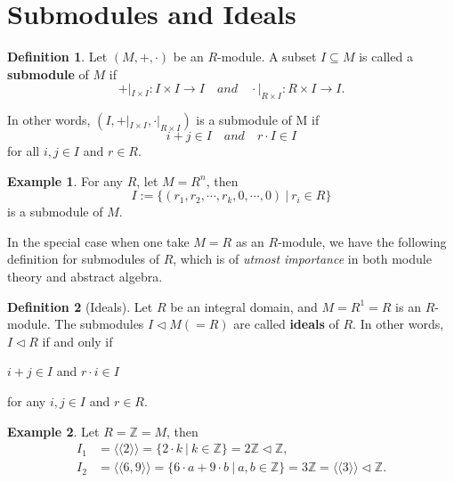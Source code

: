 \documentclass[11pt,openany]{book}
\theoremstyle{plain}
\theoremstyle{definition}
\newtheorem{definition}[definition]{Definition}
\newtheorem{example}[example]{Example}
\theoremstyle{remark}
\begin{document}
\section{Submodules and Ideals}
\begin{definition}
    Let $(M,+,\cdot)$ be an $R$-module. A subset $I \subseteq M$ is called a {\bf submodule} of $M$ if
    $$+|_{I \times I}:I \times I \to I \quad and \quad \cdot |_{R \times I}:R \times I \to I.$$
    
    In other words, $(I, +|_{I \times I}, \cdot|_{R \times I})$ is a submodule of M if
    $$i+j \in I \quad and \quad r \cdot I \in I$$
    for all $i,j \in I$ and $r \in R$.
\end{definition}

\begin{example} 
        For any $R$, let $M=R^{n}$, then 
        $$I:=\{ (r_1,r_2,\cdots,r_k,0,\cdots,0) \ |\ r_i \in R \}$$ 
        is a submodule of $M$.
\end{example}

In the special case when one take $M = R$ as an $R$-module, we have the following definition for submodules of $R$, which is of {\it utmost importance} in both module theory and abstract algebra.

\begin{definition}[Ideals]
    Let $R$ be an integral domain, and $M=R^{1}=R$ is an $R$-module. The submodules $I \lhd M(=R)$ are called {\bf ideals} of $R$. In other words, $I \lhd R$ if and only if 
    \begin{center}
    $i+j \in I$ \quad and  \quad $r \cdot i \in I$ 
    \end{center}
    for any $i,j \in I$ and $r \in R$.
\end{definition}

\begin{example}
    Let $R=\mathbb{Z}=M$, then
    \begin{align*}
        I_1&=\langle \langle 2 \rangle \rangle = \{ 2 \cdot k \ |\ k \in \mathbb{Z} \} = 2 \mathbb{Z} \lhd \mathbb{Z}, \\
        I_2&=\langle \langle 6, 9 \rangle \rangle = \{ 6 \cdot a+9 \cdot b \ |\ a,b \in \mathbb{Z} \} = 3 \mathbb{Z} = \langle \langle 3 \rangle \rangle \lhd \mathbb{Z}.
    \end{align*}
\end{example}
\end{document}
